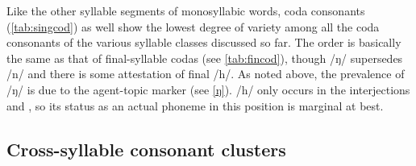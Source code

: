 Like the other syllable segments of monosyllabic words, coda consonants 
(\autoref{tab:singcod}) as well show the lowest degree of variety among all the 
coda consonants of the various syllable classes discussed so far. The order is 
basically the same as that of final-syllable codas (see \autoref{tab:fincod}), 
though /ŋ/ supersedes /n/ and there is some attestation of final /h/. As noted 
above, the prevalence of /ŋ/ is due to the agent-topic marker  
(see \autoref{ŋ}). /h/ only occurs in the interjections  and 
, so its status as an actual phoneme in this position is 
marginal at best.%

\subsection{Cross-syllable consonant clusters}

